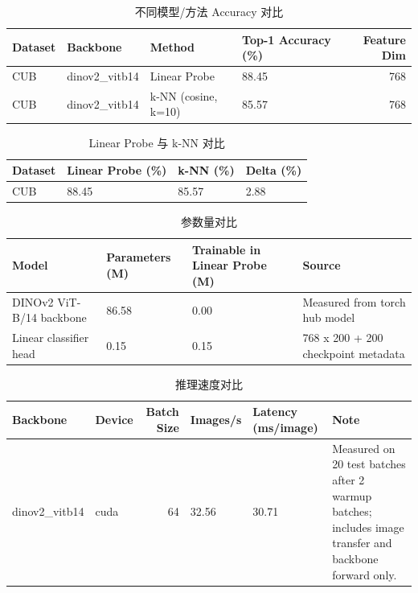 
\begin{table}
\caption{不同模型/方法 Accuracy 对比}
\label{tab:accuracy_comparison}
\begin{tabular}{llllr}
\toprule
Dataset & Backbone & Method & Top-1 Accuracy (\%) & Feature Dim \\
\midrule
CUB & dinov2\_vitb14 & Linear Probe & 88.45 & 768 \\
CUB & dinov2\_vitb14 & k-NN (cosine, k=10) & 85.57 & 768 \\
\bottomrule
\end{tabular}
\end{table}




\begin{table}
\caption{Linear Probe 与 k-NN 对比}
\label{tab:linear_probe_vs_knn}
\begin{tabular}{llll}
\toprule
Dataset & Linear Probe (\%) & k-NN (\%) & Delta (\%) \\
\midrule
CUB & 88.45 & 85.57 & 2.88 \\
\bottomrule
\end{tabular}
\end{table}




\begin{table}
\caption{参数量对比}
\label{tab:parameter_comparison}
\begin{tabular}{llll}
\toprule
Model & Parameters (M) & Trainable in Linear Probe (M) & Source \\
\midrule
DINOv2 ViT-B/14 backbone & 86.58 & 0.00 & Measured from torch hub model \\
Linear classifier head & 0.15 & 0.15 & 768 x 200 + 200 checkpoint metadata \\
\bottomrule
\end{tabular}
\end{table}




\begin{table}
\caption{推理速度对比}
\label{tab:inference_speed}
\begin{tabular}{llrlll}
\toprule
Backbone & Device & Batch Size & Images/s & Latency (ms/image) & Note \\
\midrule
dinov2\_vitb14 & cuda & 64 & 32.56 & 30.71 & Measured on 20 test batches after 2 warmup batches; includes image transfer and backbone forward only. \\
\bottomrule
\end{tabular}
\end{table}



